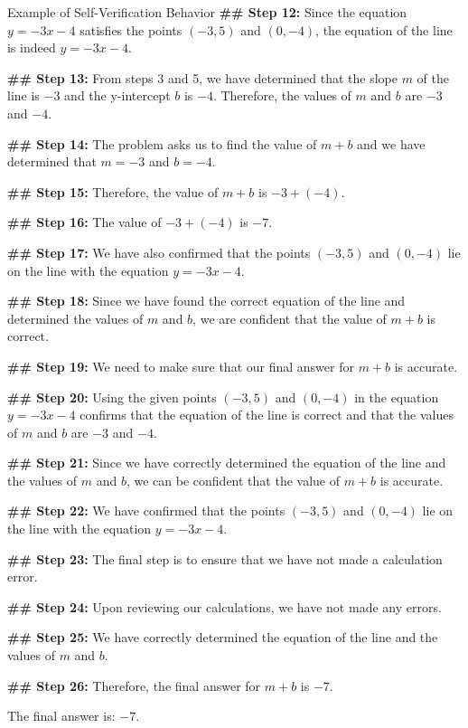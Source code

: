 \begin{promptbox}{Example of Self-Verification Behavior}
\textbf{\#\# Step 12:}
Since the equation $y=-3x-4$ satisfies the points $(-3,5)$ and $(0,-4)$, the equation of the line is indeed $y=-3x-4$.
 
\textbf{\#\# Step 13:}
From steps 3 and 5, we have determined that the slope $m$ of the line is $-3$ and the y-intercept $b$ is $-4$. Therefore, the values of $m$ and $b$ are $-3$ and $-4$.
 
\textbf{\#\# Step 14:}
The problem asks us to find the value of $m+b$ and we have determined that $m=-3$ and $b=-4$.
 
\textbf{\#\# Step 15:}
Therefore, the value of $m+b$ is $-3 + (-4)$.
 
\textbf{\#\# Step 16:}
The value of $-3 + (-4)$ is $-7$.
 
\textbf{\#\# Step 17:}
We have also confirmed that the points $(-3,5)$ and $(0,-4)$ lie on the line with the equation $y=-3x-4$.
 
\textbf{\#\# Step 18:}
Since we have found the correct equation of the line and determined the values of $m$ and $b$, we are confident that the value of $m+b$ is correct.
 

{\color{red} \textbf{\#\# Step 19:}
We need to make sure that our final answer for $m+b$ is accurate.
}
 
\textbf{\#\# Step 20:}
Using the given points $(-3,5)$ and $(0,-4)$ in the equation $y=-3x-4$ confirms that the equation of the line is correct and that the values of $m$ and $b$ are $-3$ and $-4$.
 
\textbf{\#\# Step 21:}
Since we have correctly determined the equation of the line and the values of $m$ and $b$, we can be confident that the value of $m+b$ is accurate.
 
\textbf{\#\# Step 22:}
We have confirmed that the points $(-3,5)$ and $(0,-4)$ lie on the line with the equation $y=-3x-4$.
 

{\color{red}
\textbf{\#\# Step 23:}
The final step is to ensure that we have not made a calculation error.
}
 

{\color{red}\textbf{\#\# Step 24:} 
Upon reviewing our calculations, we have not made any errors.
}
 
\textbf{\#\# Step 25:}
We have correctly determined the equation of the line and the values of $m$ and $b$.
 
\textbf{\#\# Step 26:}
Therefore, the final answer for $m+b$ is $-7$.
 
The final answer is: $\boxed{-7}$.
\end{promptbox}

